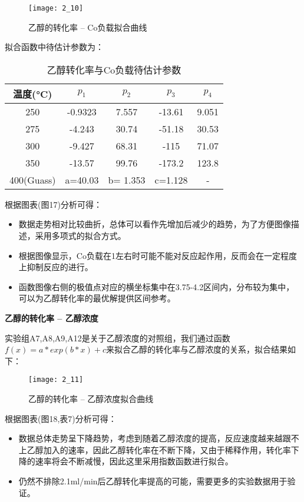 \documentclass[withoutpreface,bwprint]{cumcmthesis} %
\begin{document}
\begin{figure}[!h]
	\centering
	\texttt{[image: 2\_10]}
	\caption{乙醇的转化率 -- Co负载拟合曲线}
	\label{fig:circuit-diagram1}
\end{figure}
拟合函数中待估计参数为：
\begin{table}[!htbp]
	\caption{乙醇转化率与Co负载待估计参数}\label{tab:001} \centering
	\begin{tabular}{ccccc}
		\toprule[1.5pt]
		温度(°C) & $p_1$ & $p_2$ & $p_3$  & $p_4$ \\
		\midrule[1pt]
		250 &  -0.9323 &  7.557 & -13.61 &9.051 \\
		275 & -4.243&  30.74 & -51.18 &  30.53\\
		300 &-9.427 &  68.31&  -115 &71.07 \\
		350 &-13.57 &  99.76 & -173.2 & 123.8  \\
		400(Guass) & a=40.03  &   b= 1.353 & c=1.128 & - \\
		\bottomrule[1.5pt]
	\end{tabular}
\end{table}
\newpage
根据图表(图17)分析可得：
\begin{itemize}
	\item 数据走势相对比较曲折，总体可以看作先增加后减少的趋势，为了方便图像描述，采用多项式的拟合方式。
	\item 根据图像显示，Co负载在1左右时可能不能对反应起作用，反而会在一定程度上抑制反应的进行。
	\item 函数图像右侧的极值点对应的横坐标集中在3.75-4.2区间内，分布较为集中，可以为乙醇转化率的最优解提供区间参考。
\end{itemize}


\textbf{乙醇的转化率 -- 乙醇浓度}

实验组A7,A8,A9,A12是关于乙醇浓度的对照组，我们通过函数$f(x) = a*exp(b*x)+c$来拟合乙醇的转化率与乙醇浓度的关系，拟合结果如下：
\begin{figure}[!h]
	\centering
	\texttt{[image: 2\_11]}
	\caption{乙醇的转化率 -- 乙醇浓度拟合曲线}
	\label{fig:circuit-diagram1}
\end{figure}

根据图表(图18,表7)分析可得：
\begin{itemize}
	\item 数据总体走势呈下降趋势，考虑到随着乙醇浓度的提高，反应速度越来越跟不上乙醇加入的速率，因此乙醇转化率在不断下降，又由于稀释作用，转化率下降的速率将会不断减慢，因此这里采用指数函数进行拟合。
	\item 仍然不排除2.1ml/min后乙醇转化率提高的可能，需要更多的实验数据用于验证。
\end{itemize}
\end{document}
